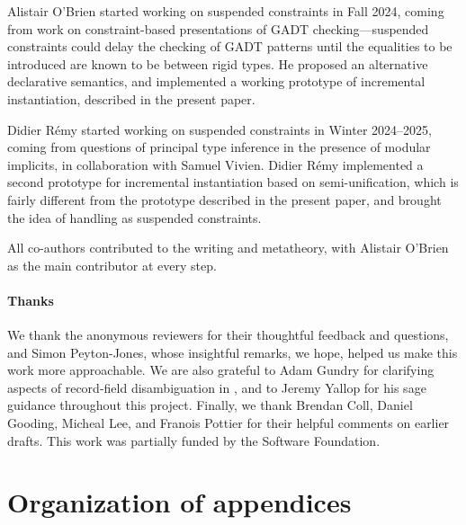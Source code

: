 \documentclass[acmsmall,screen,nonacm%
\Anonymous{,anonymous}{}%
\Final{}{,review}%
]{acmart}
\begin{document}
Alistair O'Brien started working on suspended constraints in Fall
2024, coming from work on constraint-based presentations of GADT
checking---suspended constraints could delay the checking of GADT
patterns until the equalities to be introduced are known to be between
rigid types. He proposed an alternative declarative semantics,
and implemented a working prototype of incremental instantiation, 
described in the present paper.

Didier R\'emy started working on suspended constraints in Winter
2024--2025, coming from questions of principal type inference in
the presence of modular implicits, in collaboration with Samuel
Vivien. Didier R\'emy implemented a second prototype for incremental 
instantiation based on semi-unification, which is fairly different from
the prototype described in the present paper, and brought the idea of
handling \polytypes as suspended constraints.

All co-authors contributed to the writing and metatheory, with
Alistair O'Brien as the main contributor at every step.

\paragraph{Thanks}

We thank the anonymous reviewers for their thoughtful feedback and questions,
and Simon Peyton-Jones, whose insightful remarks, we hope, helped us make this
work more approachable. We are also grateful to Adam Gundry for clarifying
aspects of record-field disambiguation in \GHC, and to Jeremy Yallop for his
sage guidance throughout this project. Finally, we thank Brendan Coll, Daniel
Gooding, Micheal Lee, and Fran{}ois Pottier for their helpful
comments on earlier drafts. 
%
This work was partially funded by the \OCaml Software Foundation.

\begin{local}
\let \t \latext \let \c \latexc


\end{local}

\newpage
\FloatBarrier %
\appendix

\section*{\Large Organization of appendices}
\label{app:outline}
\end{document}
